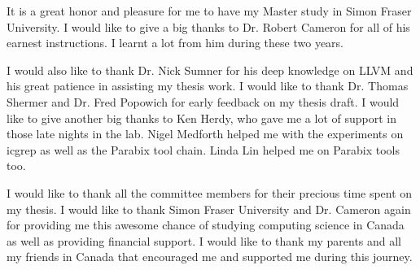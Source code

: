 
%
%


It is a great honor and pleasure for me to have my Master study in Simon Fraser University. I would like to give a big thanks to Dr. Robert Cameron for all of his earnest instructions. I learnt a lot from him during these two years.

I would also like to thank Dr. Nick Sumner for his deep knowledge on LLVM and his great patience in assisting my thesis work. I would like to thank Dr. Thomas Shermer and Dr. Fred Popowich for early feedback on my thesis draft. I would like to give another big thanks to Ken Herdy, who gave me a lot of support in those late nights in the lab. Nigel Medforth helped me with the experiments on icgrep as well as the Parabix tool chain. Linda Lin helped me on Parabix tools too.

I would like to thank all the committee members for their precious time spent on my thesis. I would like to thank Simon Fraser University and Dr. Cameron again for providing me this awesome chance of studying computing science in Canada as well as providing financial support. I would like to thank my parents and all my friends in Canada that encouraged me and supported me during this journey.












